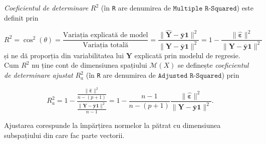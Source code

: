 \documentclass[]{article}
\begin{document}
\emph{Coeficientul de determinare} \(R^2\) (în \texttt{R} are denumirea
de \(\texttt{Multiple R-Squared}\)) este definit prin

\[
  R^2 = \cos^2(\theta) = \frac{\text{Variația explicată de model}}{\text{Variația totală}} = \frac{\lVert \hat{\boldsymbol Y} - \bar{\boldsymbol y}\mathbf{1}\rVert^2}{\lVert \boldsymbol Y - \bar{\boldsymbol y}\mathbf{1}\rVert^2} = 1 - \frac{\lVert\hat{\boldsymbol\varepsilon}\rVert^2}{\lVert \boldsymbol Y - \bar{\boldsymbol y}\mathbf{1}\rVert^2}
\] și ne dă proporția din variabilitatea lui \(\boldsymbol Y\) explicată
prin modelul de regresie. Cum \(R^2\) nu ține cont de dimensiunea
spațiului \(\mathcal{M}(X)\) se definește \emph{coeficientul de
determinare ajustat} \(R_a^2\) (în \texttt{R} are denumirea de
\(\texttt{Adjusted R-Squared}\)) prin

\[
  R_a^2 = 1 - \frac{\frac{\lVert\hat{\boldsymbol\varepsilon}\rVert^2}{n-(p+1)}}{\frac{\lVert \boldsymbol Y - \bar{\boldsymbol y}\mathbf{1}\rVert^2}{n-1}} = 1 - \frac{n-1}{n-(p+1)}\frac{\lVert\hat{\boldsymbol\varepsilon}\rVert^2}{\lVert \boldsymbol Y - \bar{\boldsymbol y}\mathbf{1}\rVert^2}.
\]

Ajustarea corespunde la împărțirea normelor la pătrat cu dimensiunea
subspațiului din care fac parte vectorii.
\end{document}
